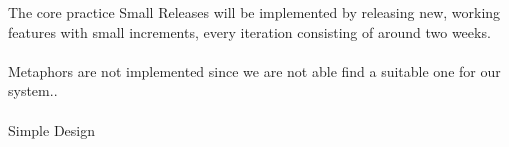 The core practice Small Releases will be implemented by releasing new, working features with small increments, every iteration consisting of around two weeks.\\\\

Metaphors are not implemented since we are not able find a suitable one for our system..\\\\

Simple Design 